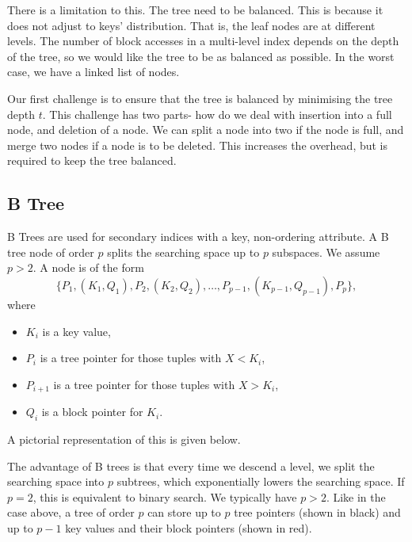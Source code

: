 \documentclass[a4paper, openany]{memoir}
\newcommand{\bnode}[3]{
    \draw (0+#1, 0+#2) -- (4.25+#1, 0+#2)
        -- (4.25+#1, 0.5+#2) 
        -- (0+#1, 0.5+#2)
        -- cycle;
    \foreach \i in {0.75, 1.75, 2.5, 3.5} {
        \draw (\i+#1, 0+#2) -- (\i+#1, 0.5+#2);
    }
    \foreach \i in {0, 1.75, 3.5} {
        \draw[fill=black] (\i+0.75/2+#1, 0.25+#2) circle (2pt);
    }
    \foreach \i in {0.75, 2.5} {
        \filldraw[red] (\i+0.75+#1, 0.25+#2) circle (2pt);
    }
    \foreach \x[count=\i] in {#3} {
        \node at (1.75*\i+#1-0.675, 0.25+#2) {\texttt{\x}};
    }
}
\begin{document}
There is a limitation to this. The tree need to be balanced. This is because it does not adjust to keys' distribution. That is, the leaf nodes are at different levels. The number of block accesses in a multi-level index depends on the depth of the tree, so we would like the tree to be as balanced as possible. In the worst case, we have a linked list of nodes.

Our first challenge is to ensure that the tree is balanced by minimising the tree depth $t$. This challenge has two parts- how do we deal with insertion into a full node, and deletion of a node. We can split a node into two if the node is full, and merge two nodes if a node is to be deleted. This increases the overhead, but is required to keep the tree balanced.

\subsection{B Tree}
B Trees are used for secondary indices with a key, non-ordering attribute. A B tree node of order $p$ splits the searching space up to $p$ subspaces. We assume $p > 2$. A node is of the form
\[\{P_1, (K_1, Q_1), P_2, (K_2, Q_2), \dots, P_{p-1}, (K_{p-1}, Q_{p-1}), P_p\},\]
where 
\begin{itemize}
    \item $K_i$ is a key value, 
    \item $P_i$ is a tree pointer for those tuples with $X < K_i$,
    \item $P_{i+1}$ is a tree pointer for those tuples with $X > K_i$,
    \item $Q_i$ is a block pointer for $K_i$.
\end{itemize}
A pictorial representation of this is given below.
\begin{figure}[H]
    \centering
\end{figure}

The advantage of B trees is that every time we descend a level, we split the searching space into $p$ subtrees, which exponentially lowers the searching space. If $p = 2$, this is equivalent to binary search. We typically have $p > 2$. Like in the case above, a tree of order $p$ can store up to $p$ tree pointers (shown in black) and up to $p-1$ key values and their block pointers (shown in red).
\end{document}
